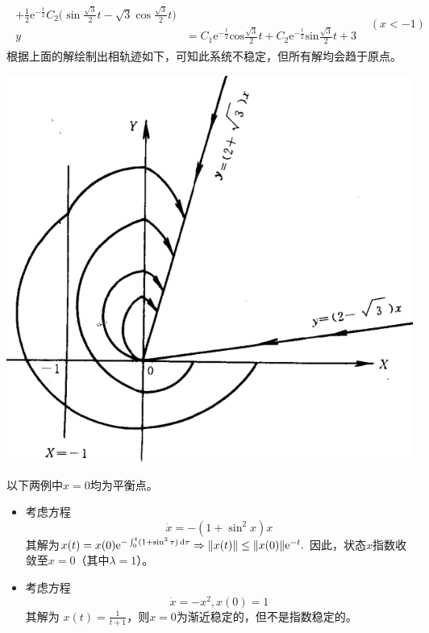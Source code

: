 \begin{example}[稳定与不稳定的图示]
\begin{itemize}[leftmargin=1em]
\begin{align*}
\begin{aligned}
        +\frac12\mathrm{e}^{-\frac t2} C_2\Big(\sin\frac{\sqrt{3}}2t-\sqrt{3}\cos\frac{\sqrt{3}}2t\Big) \\
        y&=C_{1}\mathrm{e}^{-\frac{t}{2}}\mathrm{cos}\frac{\sqrt{3}}{2}t+C_{2}\mathrm{e}^{-\frac{t}{2}}\mathrm{sin}\frac{\sqrt{3}}{2}t+3 \end{aligned}&(x<-1)
    \end{align*}
    根据上面的解绘制出相轨迹如下，可知此系统不稳定，但所有解均会趋于原点。
    \begin{center}
      \includegraphics[width=0.4\linewidth]{figure/nonlinear/unstable2.png}
    \end{center}
  \end{itemize}
\end{example}

\begin{example}[稳定与不稳定的计算例]
  以下两例中$x=0$均为平衡点。\begin{itemize}[leftmargin=1em]
    \item 考虑方程$$\dot{x}=-(1+\sin^2x)x$$
其解为$x(t)=x(0)\mathrm{e}^{-\int_{0}^{t}(1+\sin^{2}\tau)\mathop{}\!\mathrm{d}\tau}\Rightarrow\|x(t)\|\leq\|x(0)\|\mathrm{e}^{-t}.$
因此，状态$x$指数收敛至$x=0$（其中$\lambda=1$）。
\item 考虑方程$$\dot{x}=-x^2,x(0)=1$$
其解为 $x(t)=\frac1{t+1}$，则$x=0$为渐近稳定的，但不是指数稳定的。
  \end{itemize}
\end{example}
